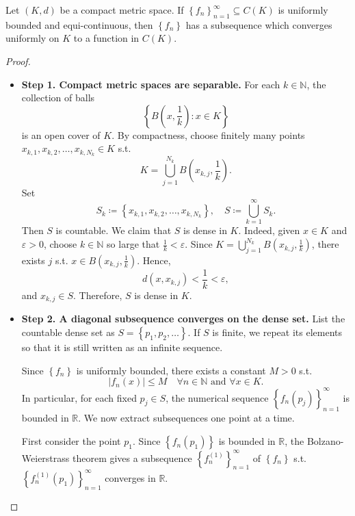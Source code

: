 \begin{theorem}
    Let \((K, d)\) be a compact metric space. If \(\left\{ f_n \right\}_{n=1}^{\infty} \subseteq C(K) \) is uniformly bounded and equi-continuous, then \(\left\{ f_n \right\} \) has a subsequence which converges uniformly on \(K\) to a function in \(C(K)\).   
\end{theorem}

\begin{proof}
\hfill
    \begin{itemize}
        \item \textbf{Step 1. Compact metric spaces are separable.} For each \(k \in \mathbb{N}\), the collection of balls 
        \[
            \left\{ B\left( x, \frac{1}{k} \right): x \in K  \right\} 
        \]
        is an open cover of \(K\). By compactness, choose finitely many points \(x_{k, 1}, x_{k, 2}, \dots , x_{k, N_k} \in K\) s.t. 
        \[
            K = \bigcup_{j=1}^{N_k} B \left( x_{k, j}, \frac{1}{k} \right).  
        \]  
        Set 
        \[
            S_k \coloneqq \left\{ x_{k, 1}, x_{k, 2}, \dots , x_{k, N_k} \right\}, \quad S \coloneqq \bigcup_{k=1}^{\infty} S_k.  
        \]
        Then \(S\) is countable. We claim that \(S\) is dense in \(K\). Indeed, given \(x \in K\) and \(\varepsilon > 0\), choose \(k \in \mathbb{N}\) so large that \(\frac{1}{k} < \varepsilon\). Since \(K = \bigcup_{j=1}^{N_k} B(x_{k, j}, \frac{1}{k}) \), there exists \(j\) s.t. \(x \in B(x_{k, j}, \frac{1}{k})\). Hence, 
        \[
            d(x, x_{k, j}) < \frac{1}{k} < \varepsilon,
        \]          
        and \(x_{k, j} \in S\). Therefore, \(S\) is dense in \(K\). 
        \item \textbf{Step 2. A diagonal subsequence converges on the dense set.} List the countable dense set as \(S = \left\{ p_1, p_2, \dots  \right\} \). If \(S\) is finite, we repeat its elements so that it is still written as an infinite sequence. 
        
        Since \(\left\{ f_n \right\} \) is uniformly bounded, there exists a constant \(M > 0\) s.t. 
        \[
            \vert f_n(x) \vert \le M \quad \forall n \in \mathbb{N} \text{ and } \forall x \in K.  
        \]  
        In particular, for each fixed \(p_j \in S\), the numerical sequence \(\left\{ f_n(p_j) \right\}_{n=1}^{\infty}  \) is bounded in \(\mathbb{R}\). We now extract subsequences one point at a time. 

        First consider the point \(p_1\). Since \(\left\{ f_n(p_1) \right\} \) is bounded in \(\mathbb{R} \), the Bolzano-Weierstrass theorem gives a subsequence \(\left\{ f_n^{(1)} \right\}_{n=1}^{\infty}  \) of \(\left\{ f_n \right\} \) s.t. \(\left\{ f_n^{(1)} (p_1) \right\}_{n=1}^{\infty}  \) converges in \(\mathbb{R}\). 


\end{itemize}
\end{proof}
